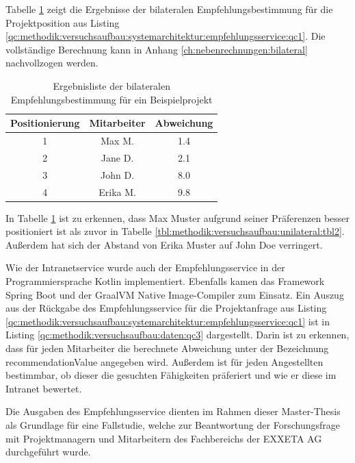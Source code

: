 Tabelle \ref{tbl:methodik:versuchsaufbau:bilateral:tbl2} zeigt die Ergebnisse der bilateralen Empfehlungsbestimmung für die Projektposition aus Listing \ref{qc:methodik:versuchsaufbau:systemarchitektur:empfehlungsservice:qc1}. Die vollständige Berechnung kann in Anhang \ref{ch:nebenrechnungen:bilateral} nachvollzogen werden.

\begin{table}[h]
	\centering
	\begin{tabular}{c|c|c}
		\textbf{Positionierung} & \textbf{Mitarbeiter} & \textbf{Abweichung}\\
		\hline
		1 & Max M.   & 1.4\\
		2 & Jane D.  & 2.1\\
		3 & John D.  & 8.0\\
		4 & Erika M. & 9.8
	\end{tabular}
	\caption{Ergebnisliste der bilateralen Empfehlungsbestimmung für ein Beispielprojekt}
	\label{tbl:methodik:versuchsaufbau:bilateral:tbl2}
\end{table}

In Tabelle \ref{tbl:methodik:versuchsaufbau:bilateral:tbl2} ist zu erkennen, dass Max Muster aufgrund seiner Präferenzen besser positioniert ist als zuvor in Tabelle \ref{tbl:methodik:versuchsaufbau:unilateral:tbl2}. Außerdem hat sich der Abstand von Erika Muster auf John Doe verringert.

Wie der Intranetservice wurde auch der Empfehlungsservice in der Programmiersprache Kotlin implementiert. Ebenfalls kamen das Framework Spring Boot und der GraalVM Native Image-Compiler zum Einsatz. Ein Auszug aus der Rückgabe des Empfehlungsservice für die Projektanfrage aus Listing \ref{qc:methodik:versuchsaufbau:systemarchitektur:empfehlungsservice:qc1} ist in Listing \ref{qc:methodik:versuchsaufbau:daten:qc3} dargestellt. Darin ist zu erkennen, dass für jeden Mitarbeiter die berechnete Abweichung unter der Bezeichnung recommendationValue angegeben wird. Außerdem ist für jeden Angestellten bestimmbar, ob dieser die gesuchten Fähigkeiten präferiert und wie er diese im Intranet bewertet.

Die Ausgaben des Empfehlungsservice dienten im Rahmen dieser Master-Thesis als Grundlage für eine Fallstudie, welche zur Beantwortung der Forschungsfrage mit Projektmanagern und Mitarbeitern des Fachbereichs \JES der EXXETA AG durchgeführt wurde.

\begin{minipage}{\linewidth}

\end{minipage}


